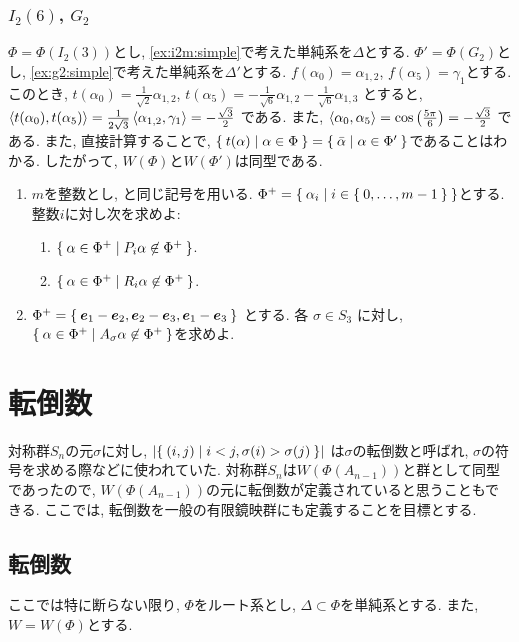 \subsection{$I_2(6)$, $G_2$}
$\Phi=\Phi(I_2(3))$とし,
\cref{ex:i2m:simple}で考えた単純系を$\Delta$とする.
$\Phi'=\Phi(G_2)$とし,
\cref{ex:g2:simple}で考えた単純系を$\Delta'$とする.
$f(\alpha_0)=\alpha_{1,2}$,
$f(\alpha_5)=\gamma_{1}$とする.
このとき,
$t(\alpha_0)=\frac{1}{\sqrt 2}\alpha_{1,2}$,
$t(\alpha_5)=-\frac{1}{\sqrt 6}\alpha_{1,2}-\frac{1}{\sqrt 6}\alpha_{1,3}$
とすると,
$\Braket{t(\alpha_0),t(\alpha_5)}=\frac{1}{2\sqrt 3}\Braket{\alpha_{1,2},\gamma_{1}}=-\frac{\sqrt 3}{2}$
である.
また,
$\Braket{\alpha_0,\alpha_5}=\cos\left(\frac{5\pi}{6}\right)=-\frac{\sqrt{3}}{2}$
である.
また,
直接計算することで,
$\Set{t(\alpha)|\alpha\in\Phi}=\Set{\bar\alpha|\alpha\in \Phi'}$であることはわかる.
したがって, $W(\Phi)$と$W(\Phi')$は同型である.

\begin{enumerate}
\item
  $m$を整数とし,
  と同じ記号を用いる.
  $\Phi^+=\Set{\alpha_i|i\in\Set{0,\ldots,m-1}}$とする.
  整数$i$に対し次を求めよ:
  \begin{enumerate}
  \item $\Set{\alpha\in \Phi^+| P_i\alpha\not\in \Phi^+}$.
  \item $\Set{\alpha\in \Phi^+| R_i\alpha\not\in \Phi^+}$.
  \end{enumerate}
\item
  $\Phi^+=\Set{\boldsymbol{e}_1-\boldsymbol{e}_2,\boldsymbol{e}_2-\boldsymbol{e}_3,\boldsymbol{e}_1-\boldsymbol{e}_3}$
  とする.
  各
  $\sigma\in S_3$
  に対し,
  $\Set{\alpha\in \Phi^+|A_\sigma \alpha \not\in \Phi^{+}}$を求めよ.
\end{enumerate}


\chapter{転倒数}
対称群$S_n$の元$\sigma$に対し,
$\left|\Set{(i,j)|i<j, \sigma(i)>\sigma(j)}\right|$
は$\sigma$の転倒数と呼ばれ,
$\sigma$の符号を求める際などに使われていた.
対称群$S_n$は$W(\Phi(A_{n-1}))$と群として同型であったので,
$W(\Phi(A_{n-1}))$の元に転倒数が定義されていると思うこともできる.
ここでは,
転倒数を一般の有限鏡映群にも定義することを目標とする.


\section{転倒数}
ここでは特に断らない限り,
$\Phi$をルート系とし, $\Delta\subset\Phi$を単純系とする.
また, $W=W(\Phi)$とする.

